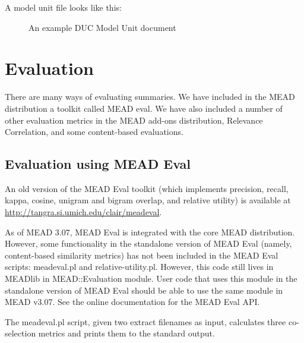 \documentclass[10pt]{article}
\begin{document}
A model unit file looks like this:

\begin{figure}[htp!]
\centering
{}
\caption{An example DUC Model Unit document}
\label{figure:MUdoc}
\end{figure}


\section{Evaluation}
There are many ways of evaluating summaries.  We have included in the MEAD 
distribution a toolkit called MEAD eval.  We have also included a number 
of other evaluation metrics in the MEAD add-ons distribution, Relevance 
Correlation, and some content-based evaluations.

\subsection{Evaluation using MEAD Eval}

An old version of the MEAD Eval toolkit (which implements precision, recall,
kappa, cosine, unigram and bigram overlap, and relative utility) is
available at \url{http://tangra.si.umich.edu/clair/meadeval}.

As of MEAD 3.07, MEAD Eval is integrated with the core MEAD distribution.
However, some functionality in the standalone version of MEAD
Eval (namely, content-based similarity metrics) has not been
included in the MEAD Eval scripts: meadeval.pl and
relative-utility.pl.  However, this code still lives in MEADlib
in MEAD::Evaluation module.  User code that uses this module in
the standalone version of MEAD Eval should be able to use the
same module in MEAD v3.07.  See the online documentation for 
the MEAD Eval API.

The meadeval.pl script, given two extract filenames as input,
calculates three co-selection metrics and prints them to the standard output.
\end{document}
